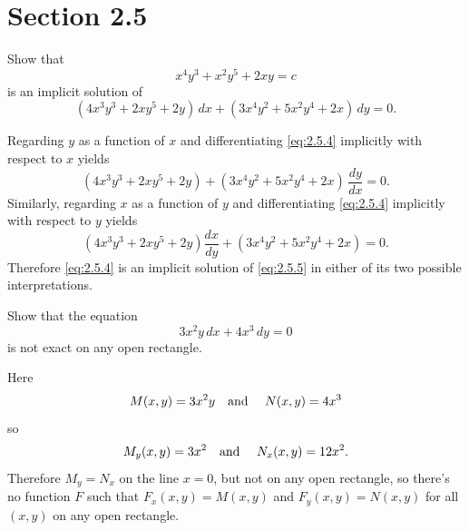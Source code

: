 \section*{Section 2.5}
\setcounter{chapter}{2}
\setcounter{section}{5}

\setcounter{example}{0}
\setcounter{equation}{3}
\begin{example}
  \label{example:2.5.1} \rm Show that
  \begin{equation}
    \label{eq:2.5.4}x^{4}y^{3}+x^{2}y^{5}+2xy=c
  \end{equation}
  is an implicit solution of
  \begin{equation}
    \label{eq:2.5.5}(4x^{3}y^{3}+2xy^{5}+2y)\,dx+(3x^{4}y^{2}+5x^{2}y^{4}+2x)\,dy=0.
  \end{equation}
\end{example}
\begin{examplesolution}
\solution Regarding $y$ as a function of $x$ and differentiating \eqref{eq:2.5.4} implicitly with
respect to $x$ yields
\[
  (4x^{3}y^{3}+2xy^{5}+2y)+(3x^{4}y^{2}+5x^{2}y^{4}+2x)\,\frac{dy}{dx}=0.
\]
Similarly, regarding $x$ as a function of $y$ and differentiating \eqref{eq:2.5.4} implicitly with
respect to $y$ yields
\[
  (4x^{3}y^{3}+2xy^{5}+2y)\frac{dx}{dy}+(3x^{4}y^{2}+5x^{2}y^{4}+2x)=0.
\]
Therefore \eqref{eq:2.5.4} is an implicit solution of \eqref{eq:2.5.5} in either of its two possible
interpretations. \bbox
\end{examplesolution}

\setcounter{example}{1}
\begin{example}
  \label{example:2.5.2} \rm Show that the equation
  \[
    3x^{2}y\,dx+4x^{3}\,dy=0
  \]
  is not exact on any open rectangle.
\end{example}
\begin{examplesolution}
\solution Here
\[
  M(x,y)=3x^{2}y\mbox{\quad and \quad}N(x,y)=4x^{3}
\]
so
\[
  M_{y}(x,y)=3x^{2}\mbox{\quad and \quad}N_{x}(x,y)=12x^{2}.
\]
Therefore $M_{y}=N_{x}$ on the line $x=0$, but not on any open rectangle, so there's no function $F$
such that $F_{x}(x,y)=M(x,y)$ and $F_{y}(x,y)=N(x,y)$ for all $(x,y)$ on any open rectangle. \bbox
\end{examplesolution}


